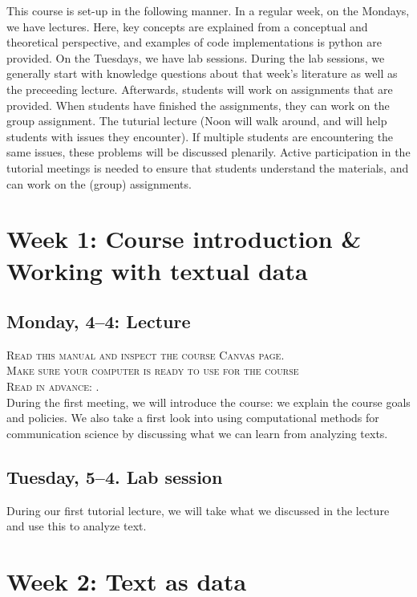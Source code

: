 This course is set-up in the following manner. In a regular week, on the Mondays, we have lectures. Here, key concepts are explained from a conceptual and theoretical perspective, and examples of code implementations is python are provided.  On the Tuesdays, we have lab sessions. During the lab sessions, we generally start with knowledge questions about that week's literature as well as the preceeding lecture. Afterwards, students will work on assignments that are provided. When students have finished the assignments, they can work on the group assignment. The tuturial lecture (Noon will walk around, and will help students with issues they encounter). If multiple students are encountering the same issues, these problems will be discussed plenarily. Active participation in the tutorial meetings is needed to ensure that students understand the materials, and can work on the (group) assignments.

\section*{Week 1: Course introduction \& Working with textual data}

\subsection*{Monday, 4--4: Lecture}
\textsc{ Read this manual and inspect the course Canvas page.}\\
\textsc{ Make sure your computer is ready to use for the course }\\
\textsc{ Read in advance: \cite{Hirschenberg2015}.} \\

During the first meeting, we will introduce the course: we explain the course goals and policies. We also take a first look into using computational methods for communication science by discussing what we can learn from analyzing texts.


\subsection*{Tuesday, 5--4. Lab session}
During our first tutorial lecture, we will take what we discussed in the lecture and use this to analyze text.

\section*{Week 2: Text as data}


